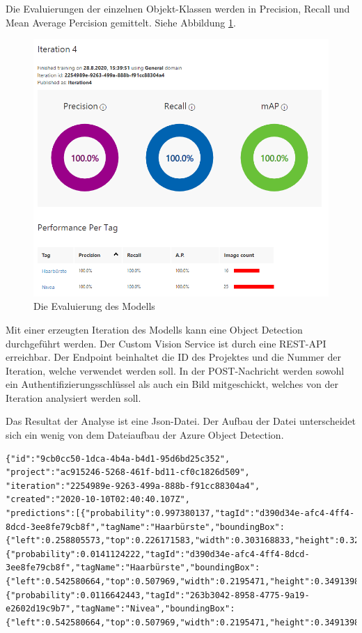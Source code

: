 Die Evaluierungen der einzelnen Objekt-Klassen werden in Precision, Recall und Mean Average Percision gemittelt. Siehe Abbildung  \ref{img:trainineval}.

\begin{figure}[H]
	\centering
	\includegraphics[width=1\textwidth]{images/trainingevaluation.png}
	\caption[Evaluierung eines Azure Custom Detection Modells]{Die Evaluierung des Modells}
	\label{img:trainineval}
\end{figure}

Mit einer erzeugten Iteration des Modells kann eine Object Detection durchgeführt werden. Der Custom Vision Service ist durch eine REST-API erreichbar. Der Endpoint beinhaltet die ID des Projektes und die Nummer der Iteration, welche verwendet werden soll. In der POST-Nachricht werden sowohl ein Authentifizierungsschlüssel als auch ein Bild mitgeschickt, welches von der Iteration analysiert werden soll.

Das Resultat der Analyse ist eine Json-Datei. 
Der Aufbau der Datei unterscheidet sich ein wenig von dem Dateiaufbau der Azure Object Detection.  

\begin{lstlisting}
{"id":"9cb0cc50-1dca-4b4a-b4d1-95d6bd25c352",
"project":"ac915246-5268-461f-bd11-cf0c1826d509",
"iteration":"2254989e-9263-499a-888b-f91cc88304a4",
"created":"2020-10-10T02:40:40.107Z",
"predictions":[{"probability":0.997380137,"tagId":"d390d34e-afc4-4ff4-8dcd-3ee8fe79cb8f","tagName":"Haarbürste","boundingBox":{"left":0.258805573,"top":0.226171583,"width":0.303168833,"height":0.329167157}},
{"probability":0.0141124222,"tagId":"d390d34e-afc4-4ff4-8dcd-3ee8fe79cb8f","tagName":"Haarbürste","boundingBox":{"left":0.542580664,"top":0.507969,"width":0.2195471,"height":0.3491398}},
{"probability":0.0116642443,"tagId":"263b3042-8958-4775-9a19-e2602d19c9b7","tagName":"Nivea","boundingBox":{"left":0.542580664,"top":0.507969,"width":0.2195471,"height":0.3491398}}]}
\end{lstlisting}

